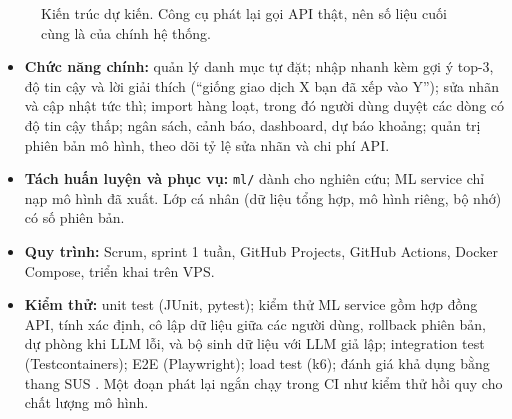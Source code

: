 \documentclass[12pt,a4paper]{article}
\begin{document}
\begin{figure}[H]
\centering
{}
\caption{Kiến trúc dự kiến. Công cụ phát lại gọi API thật, nên số liệu cuối cùng là của chính hệ thống.}
\end{figure}

\begin{itemize}
  \item \textbf{Chức năng chính:} quản lý danh mục tự đặt; nhập nhanh kèm gợi ý top-3, độ tin cậy và lời giải thích (``giống giao dịch X bạn đã xếp vào Y''); sửa nhãn và cập nhật tức thì; import hàng loạt, trong đó người dùng duyệt các dòng có độ tin cậy thấp; ngân sách, cảnh báo, dashboard, dự báo khoảng; quản trị phiên bản mô hình, theo dõi tỷ lệ sửa nhãn và chi phí API.
  \item \textbf{Tách huấn luyện và phục vụ:} \texttt{ml/} dành cho nghiên cứu; ML service chỉ nạp mô hình đã xuất. Lớp cá nhân (dữ liệu tổng hợp, mô hình riêng, bộ nhớ) có số phiên bản.
  \item \textbf{Quy trình:} Scrum, sprint 1 tuần, GitHub Projects, GitHub Actions, Docker Compose, triển khai trên VPS.
  \item \textbf{Kiểm thử:} unit test (JUnit, pytest); kiểm thử ML service gồm hợp đồng API, tính xác định, cô lập dữ liệu giữa các người dùng, rollback phiên bản, dự phòng khi LLM lỗi, và bộ sinh dữ liệu với LLM giả lập; integration test (Testcontainers); E2E (Playwright); load test (k6); đánh giá khả dụng bằng thang SUS \citep{brooke1996sus}. Một đoạn phát lại ngắn chạy trong CI như kiểm thử hồi quy cho chất lượng mô hình.
\end{itemize}
\end{document}
